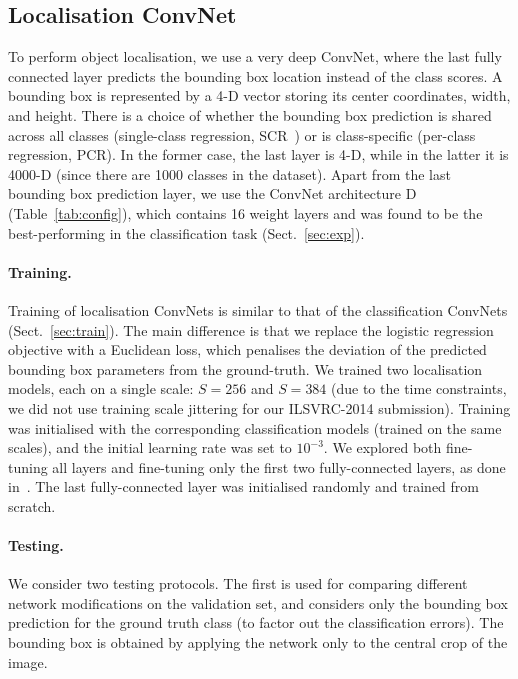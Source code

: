 \documentclass{article} %
\newcommand{\tblref}[1]{Table~\ref{#1}}
\newcommand{\sref}[1]{Sect.~\ref{#1}}
\begin{document}
\subsection{Localisation ConvNet}
\label{sec:loc_method}
To perform object localisation, we use a very deep ConvNet, where the last fully connected layer predicts the bounding box location instead of the class scores.
A bounding box is represented by a 4-D vector storing its center coordinates, width, and height. There is a choice of whether the bounding box prediction is shared across all classes
(single-class regression, SCR~\citep{Sermanet14}) or is class-specific (per-class regression, PCR). In the former case, the last layer is 4-D, while in the latter it is 4000-D (since
there are 1000 classes in the dataset).
Apart from the last bounding box prediction layer, we use the ConvNet architecture D (\tblref{tab:config}), which contains 16 weight layers and was found to be the best-performing in the classification task
(\sref{sec:exp}). 

\paragraph{Training.} 
Training of localisation ConvNets is similar to that of the classification ConvNets (\sref{sec:train}).
The main difference is that we replace the logistic regression objective with a Euclidean loss, which penalises the deviation of the predicted bounding box parameters from the ground-truth.
We trained two localisation models, each on a single scale: $S=256$ and $S=384$ (due to the time constraints, we did not use training scale jittering for our ILSVRC-2014 submission).
Training was initialised with the corresponding classification models (trained on the same scales), and the initial learning rate was set to $10^{-3}$.
We explored both fine-tuning all layers and fine-tuning only the first two fully-connected layers, as done in~\citep{Sermanet14}. The last fully-connected layer was
initialised randomly and trained from scratch.

\paragraph{Testing.} 
We consider two testing protocols. 
The first is used for comparing different network modifications on the validation set, and considers only the bounding box prediction for the ground truth class (to factor out the classification errors).
The bounding box is obtained by applying the network only to the central crop of the image.
\end{document}
